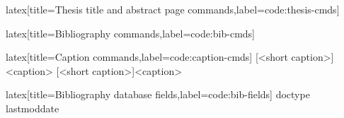 \begin{code}[firstnumber=last]{latex}[title={Thesis title and abstract page commands},label=code:thesis-cmds]
\maketitle[thesis]
\end{code}
%
\begin{code}[firstnumber=last]{latex}[title={Bibliography commands},label=code:bib-cmds]
\makebibliography[<options>]
\end{code}
%
\begin{code}[firstnumber=last]{latex}[title={Caption commands},label=code:caption-cmds]
[<short caption>]{<caption>}
[<short caption>]{<caption>}
\end{code}
%
\begin{code}[firstnumber=last]{latex}[title={Bibliography database fields},label=code:bib-fields]
doctype
lastmoddate
\end{code}
